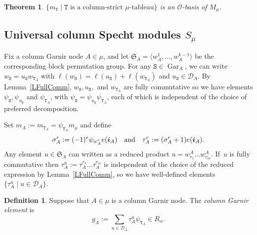 \documentclass[twoside,11pt,reqno]{amsart}
\numberwithin{equation}{section}
\newtheorem{Theorem}[equation]{Theorem}
\theoremstyle{definition}  %
\newtheorem{Definition}[equation]{Definition}
\def\bi{\text{\boldmath$i$}}
\newcommand{\Stab}{\operatorname{Stab}}
\newcommand{\0}{{\bar 0}}
\newcommand{\1}{{\bar 1}}
\newcommand{\al}{\alpha}
\def\Si{\mathfrak{S}}
\newcommand{\si}{\sigma}
\newcommand{\D}{{\mathscr D}}
\newcommand\Par[1][]{{\mathscr P}^{\kappa#1}}
\def\T{{\mathtt T}}
\def\Stab{{\mathtt S}}
\def\Gar{{\operatorname{Gar}}}
\renewcommand\O{\mathcal O}
\begin{document}
\begin{Theorem} \label{signed TMMUBasis}%
$
\{m_\T\mid \text{$\T$ is a column-strict $\mu$-tableau}\}
$
is an $\O$-basis of $M_\mu$.  
\end{Theorem}



\subsection{\boldmath Universal column Specht modules $S_\mu$}\label{SSdual}

Fix a column Garnir node $A\in\mu$, and let $\Si_A=\langle w^1_A,\dots,w^{k-1}_A\rangle$ be the corresponding block permutation group. 
For
any $\Stab\in\Gar_A$, we can write $w_\Stab=u_\Stab w_{\T_A}$ with
$\ell(w_\Stab)=\ell(u_\Stab)+\ell(w_{\T_A})$ and $u_\Stab\in\D_A$. %
By Lemma~\ref{LFullComm}, %
$w_\Stab,u_\Stab,$ and $w_{\T_A}$ are fully commutative so we have
elements $\psi_\Stab,\psi_{u_\Stab}$ and $\psi_{\T_A}$, with
$\psi_\Stab=\psi_{u_\Stab}\psi_{\T_A}$, each of which is independent of the choice of preferred
decomposition.


Set $m_A:=m_{\T_A}=\psi_{\T_A}m_\mu$ %
and define 
$$
\si^r_A:=(-1)^e\psi_{w^r_A}e(\bi_A)\quad\text{and}\quad \tau^r_A:=(\si^r_A+1)e(\bi_A). 
$$
Any element $u\in\Si_A$ can written as a reduced product $u=w_{r_1}^A\dots w_{r_m}^A$.
If~$u$ is fully
commutative then %
$\tau^u_A:=\tau^{r_1}_A\dots \tau^{r_m}_A$
is independent of the choice of the reduced expression by Lemma~\ref{LFullComm},
so we have well-defined elements 
$\{\tau^u_A\mid u\in \D_A\}$.


\begin{Definition}\label{dual Specht relations}%
Suppose that %
$A\in\mu$ is a column Garnir node. The {\em column Garnir
element} is  
$$
g_A:=\sum_{u\in\D_A}\tau^u_A\psi_{\T_A}\in R_\al.  %
$$
\end{Definition}
\end{document}
